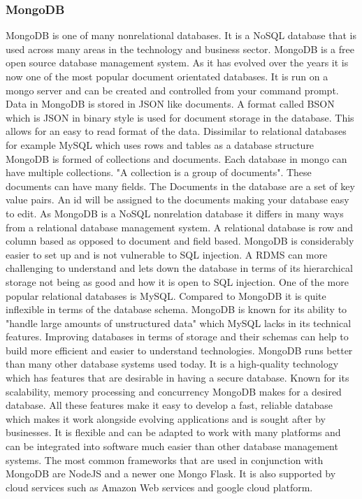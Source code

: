 \subsubsection{MongoDB}
MongoDB is one of many nonrelational databases. It is a NoSQL database that is used across many areas in the technology and business sector. MongoDB is a free open source database management system. As it has evolved over the years it is now one of the most popular document orientated databases. It is run on a mongo server and can be created and controlled from your command prompt. Data in MongoDB is stored in JSON like documents. A format called BSON which is JSON in binary style is used for document storage in the database.\cite{MongoDB} This allows for an easy to read format of the data. Dissimilar to relational databases for example MySQL which uses rows and tables as a database structure MongoDB is formed of collections and documents. Each database in mongo can have multiple collections. "A collection is a group of documents".\cite{MongoDBColections} These documents can have many fields. The Documents in the database are a set of key value pairs. An id will be assigned to the documents making your database easy to edit. As MongoDB is a NoSQL nonrelation database it differs in many ways from a relational database management system. A relational database is row and column based as opposed to document and field based.\cite{MongoDBColections} MongoDB is considerably easier to set up and is not vulnerable to SQL injection. A RDMS can more challenging to understand and lets down the database in terms of its hierarchical storage not being as good and how it is open to SQL injection. One of the more popular relational databases is MySQL. Compared to MongoDB it is quite inflexible in terms of the database schema. \cite{MongoDB} MongoDB is known for its ability to "handle large amounts of unstructured data" which MySQL lacks in its technical features. \cite{MongoVsMysql} Improving databases in terms of storage and their schemas can help to build more efficient and easier to understand technologies. MongoDB runs better than many other database systems used today. It is a high-quality technology which has features that are desirable in having a secure database. Known for its scalability, memory processing and concurrency MongoDB makes for a desired database. All these features make it easy to develop a fast, reliable database which makes it work alongside evolving applications and is sought after by businesses. It is flexible and can be adapted to work with many platforms and can be integrated into software much easier than other database management systems. The most common frameworks that are used in conjunction with MongoDB are NodeJS and a newer one Mongo Flask. It is also supported by cloud services such as Amazon Web services and google cloud platform.

